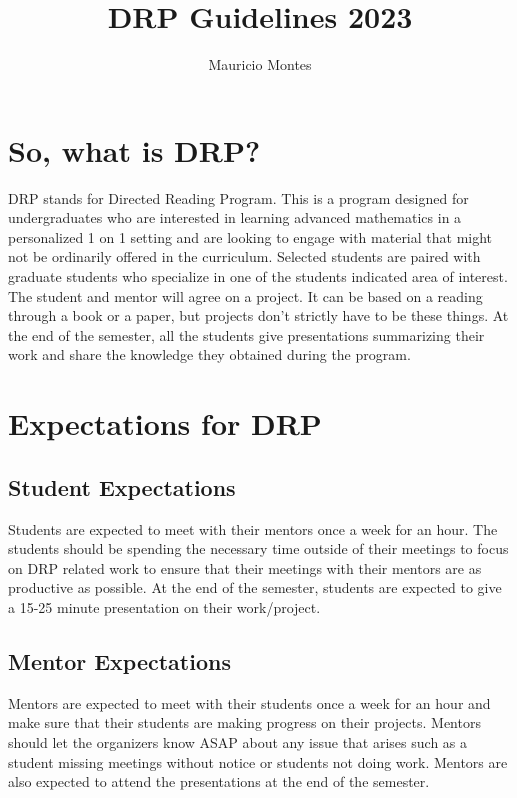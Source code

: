 \documentclass{article}
\begin{document}
\author{Mauricio Montes}
\title{DRP Guidelines 2023}

\maketitle

\section{So, what is DRP?}

DRP stands for Directed Reading Program. This is a program designed for undergraduates who are
interested in learning advanced mathematics in a personalized 1 on 1 setting and are looking to
engage with material that might not be ordinarily offered in the curriculum. Selected students are
paired with graduate students who specialize in one of the students indicated area of interest. The
student and mentor will agree on a project. It can be based on a reading through a book or a paper,
but projects don't strictly have to be these things. At the end of the semester, all the students give presentations summarizing their work and share the knowledge they obtained during the program.

\section{Expectations for DRP}

\subsection{Student Expectations}

Students are expected to meet with their mentors once a week for an hour. The students should be
spending the necessary time outside of their meetings to focus on DRP related work to ensure that their
meetings with their mentors are as productive as possible. At the end of the semester, students are
expected to give a 15-25 minute presentation on their work/project. 


\subsection{Mentor Expectations}

Mentors are expected to meet with their students once a week for an hour and make sure that their
students are making progress on their projects. Mentors should let the organizers know ASAP about
any issue that arises such as a student missing meetings without notice or students not doing work.
Mentors are also expected to attend the presentations at the end of the semester.
\end{document}
